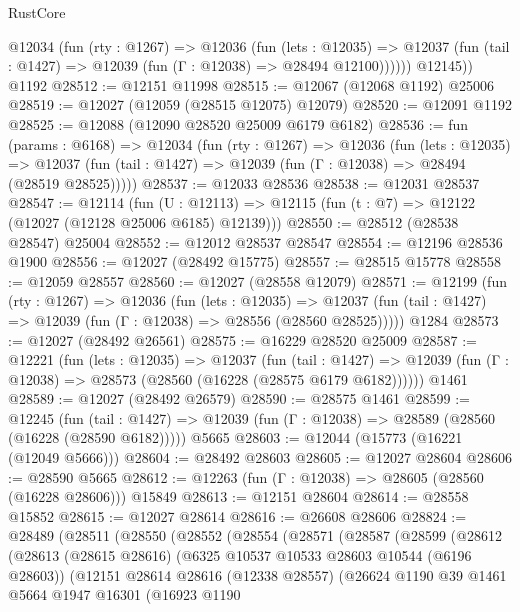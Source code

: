 \begin{lexlean}{RustCore}
\begin{coremodule}
          @12034
            (fun (rty : @1267) =>
            @12036
              (fun (lets : @12035) =>
              @12037 (fun (tail : @1427) => @12039 (fun (Γ : @12038) => @28494 @12100))))))
        @12145))
    @1192
@28512 := @12151 @11998
@28515 := @12067 (@12068 @1192) @25006
@28519 := @12027 (@12059 (@28515 @12075) @12079)
@28520 := @12091 @1192
@28525 := @12088 (@12090 @28520 @25009 @6179 @6182)
@28536 := fun (params : @6168) =>
  @12034
    (fun (rty : @1267) =>
    @12036
      (fun (lets : @12035) =>
      @12037 (fun (tail : @1427) => @12039 (fun (Γ : @12038) => @28494 (@28519 @28525)))))
@28537 := @12033 @28536
@28538 := @12031 @28537
@28547 := @12114
    (fun (U : @12113) => @12115 (fun (t : @7) => @12122 (@12027 (@12128 @25006 @6185) @12139)))
@28550 := @28512 (@28538 @28547) @25004
@28552 := @12012 @28537 @28547
@28554 := @12196 @28536 @1900
@28556 := @12027 (@28492 @15775)
@28557 := @28515 @15778
@28558 := @12059 @28557
@28560 := @12027 (@28558 @12079)
@28571 := @12199
    (fun (rty : @1267) =>
    @12036
      (fun (lets : @12035) =>
      @12037 (fun (tail : @1427) => @12039 (fun (Γ : @12038) => @28556 (@28560 @28525)))))
    @1284
@28573 := @12027 (@28492 @26561)
@28575 := @16229 @28520 @25009
@28587 := @12221
    (fun (lets : @12035) =>
    @12037
      (fun (tail : @1427) =>
      @12039 (fun (Γ : @12038) => @28573 (@28560 (@16228 (@28575 @6179 @6182))))))
    @1461
@28589 := @12027 (@28492 @26579)
@28590 := @28575 @1461
@28599 := @12245
    (fun (tail : @1427) => @12039 (fun (Γ : @12038) => @28589 (@28560 (@16228 (@28590 @6182)))))
    @5665
@28603 := @12044 (@15773 (@16221 (@12049 @5666)))
@28604 := @28492 @28603
@28605 := @12027 @28604
@28606 := @28590 @5665
@28612 := @12263 (fun (Γ : @12038) => @28605 (@28560 (@16228 @28606))) @15849
@28613 := @12151 @28604
@28614 := @28558 @15852
@28615 := @12027 @28614
@28616 := @26608 @28606
@28824 := @28489
    (@28511
      (@28550
        (@28552
          (@28554
            (@28571
              (@28587
                (@28599
                  (@28612
                    (@28613
                      (@28615 @28616)
                      (@6325 @10537 @10533 @28603 @10544 (@6196 @28603))
                      (@12151
                        @28614
                        @28616
                        (@12338 @28557)
                        (@26624
                          @1190
                          @39
                          @1461
                          @5664
                          @1947
                          @16301
                          (@16923
                            @1190

\end{coremodule}
\end{lexlean}
